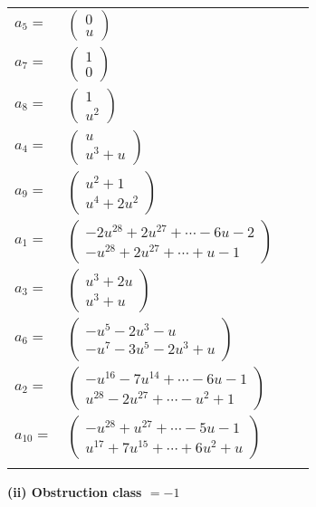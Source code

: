 \documentclass[1p]{elsarticle_modified}
\theoremstyle{definition}
\begin{document}
\begin{tabular}{m{7pt} m{180pt} m{7pt} m{180pt} }
\flushright $a_{5}=$&$\begin{pmatrix}0\\u\end{pmatrix}$ \\
\flushright $a_{7}=$&$\begin{pmatrix}1\\0\end{pmatrix}$ \\
\flushright $a_{8}=$&$\begin{pmatrix}1\\u^2\end{pmatrix}$ \\
\flushright $a_{4}=$&$\begin{pmatrix}u\\u^3+u\end{pmatrix}$ \\
\flushright $a_{9}=$&$\begin{pmatrix}u^2+1\\u^4+2 u^2\end{pmatrix}$ \\
\flushright $a_{1}=$&$\begin{pmatrix}-2 u^{28}+2 u^{27}+\cdots-6 u-2\\- u^{28}+2 u^{27}+\cdots+u-1\end{pmatrix}$ \\
\flushright $a_{3}=$&$\begin{pmatrix}u^3+2 u\\u^3+u\end{pmatrix}$ \\
\flushright $a_{6}=$&$\begin{pmatrix}- u^5-2 u^3- u\\- u^7-3 u^5-2 u^3+u\end{pmatrix}$ \\
\flushright $a_{2}=$&$\begin{pmatrix}- u^{16}-7 u^{14}+\cdots-6 u-1\\u^{28}-2 u^{27}+\cdots- u^2+1\end{pmatrix}$ \\
\flushright $a_{10}=$&$\begin{pmatrix}- u^{28}+u^{27}+\cdots-5 u-1\\u^{17}+7 u^{15}+\cdots+6 u^2+u\end{pmatrix}$\\&\end{tabular}
\flushleft \textbf{(ii) Obstruction class $= -1$}\\~\\
\end{document}
